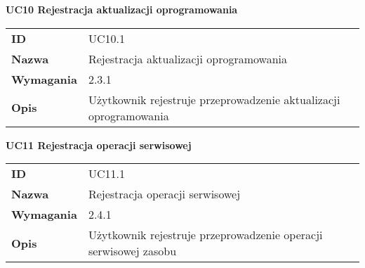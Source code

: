 \vspace{.03\textheight}
\begin{center}
  {\Large\bf UC10 Rejestracja aktualizacji oprogramowania} \\
\end{center}
\vspace{.02\textheight}

\begin{tabular}{p{}p{}}
\hfill {\bf ID} & UC10.1 \\
\hfill {\bf Nazwa} & Rejestracja aktualizacji oprogramowania \\
\hfill {\bf Wymagania} & 2.3.1 \\
\hfill {\bf Opis} & Użytkownik rejestruje przeprowadzenie aktualizacji oprogramowania \\
\end{tabular}

\vspace{.03\textheight}
\begin{center}
  {\Large\bf UC11 Rejestracja operacji serwisowej} \\
\end{center}
\vspace{.02\textheight}

\begin{tabular}{p{}p{}}
\hfill {\bf ID} & UC11.1 \\
\hfill {\bf Nazwa} &  Rejestracja operacji serwisowej \\
\hfill {\bf Wymagania} &  2.4.1 \\
\hfill {\bf Opis} & Użytkownik rejestruje przeprowadzenie operacji serwisowej zasobu  \\
\end{tabular}

